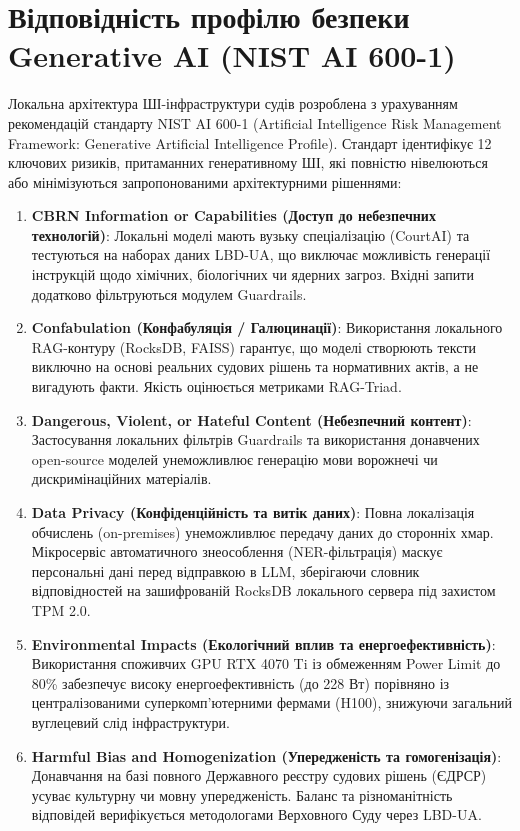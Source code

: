 \documentclass{article}
\begin{document}
\section{Відповідність профілю безпеки Generative AI (NIST AI 600-1)}
Локальна архітектура ШІ-інфраструктури судів розроблена з урахуванням рекомендацій стандарту NIST AI 600-1 (Artificial Intelligence Risk Management Framework: Generative Artificial Intelligence Profile). Стандарт ідентифікує 12 ключових ризиків, притаманних генеративному ШІ, які повністю нівелюються або мінімізуються запропонованими архітектурними рішеннями:

\begin{enumerate}
\item \textbf{CBRN Information or Capabilities (Доступ до небезпечних технологій)}: Локальні моделі мають вузьку спеціалізацію (CourtAI) та тестуються на наборах даних LBD-UA, що виключає можливість генерації інструкцій щодо хімічних, біологічних чи ядерних загроз. Вхідні запити додатково фільтруються модулем Guardrails.
\item \textbf{Confabulation (Конфабуляція / Галюцинації)}: Використання локального RAG-контуру (RocksDB, FAISS) гарантує, що моделі створюють тексти виключно на основі реальних судових рішень та нормативних актів, а не вигадують факти. Якість оцінюється метриками RAG-Triad.
\item \textbf{Dangerous, Violent, or Hateful Content (Небезпечний контент)}: Застосування локальних фільтрів Guardrails та використання донавчених open-source моделей унеможливлює генерацію мови ворожнечі чи дискримінаційних матеріалів.
\item \textbf{Data Privacy (Конфіденційність та витік даних)}: Повна локалізація обчислень (on-premises) унеможливлює передачу даних до сторонніх хмар. Мікросервіс автоматичного знеособлення (NER-фільтрація) маскує персональні дані перед відправкою в LLM, зберігаючи словник відповідностей на зашифрованій RocksDB локального сервера під захистом TPM 2.0.
\item \textbf{Environmental Impacts (Екологічний вплив та енергоефективність)}: Використання споживчих GPU RTX 4070 Ti із обмеженням Power Limit до 80\% забезпечує високу енергоефективність (до 228 Вт) порівняно із централізованими суперкомп'ютерними фермами (H100), знижуючи загальний вуглецевий слід інфраструктури.
\item \textbf{Harmful Bias and Homogenization (Упередженість та гомогенізація)}: Донавчання на базі повного Державного реєстру судових рішень (ЄДРСР) усуває культурну чи мовну упередженість. Баланс та різноманітність відповідей верифікується методологами Верховного Суду через LBD-UA.

\end{enumerate}
\end{document}
